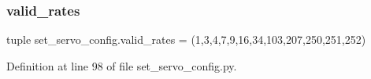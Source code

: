 \mbox{\label{namespaceset__servo__config_a36ffc5e0e58ceabf57966c17a63b792c}} 
\subsubsection{\texorpdfstring{valid\+\_\+rates}{valid\_rates}}
{\footnotesize\ttfamily tuple set\+\_\+servo\+\_\+config.\+valid\+\_\+rates = (1,3,4,7,9,16,34,103,207,250,251,252)}



Definition at line 98 of file set\+\_\+servo\+\_\+config.\+py.

